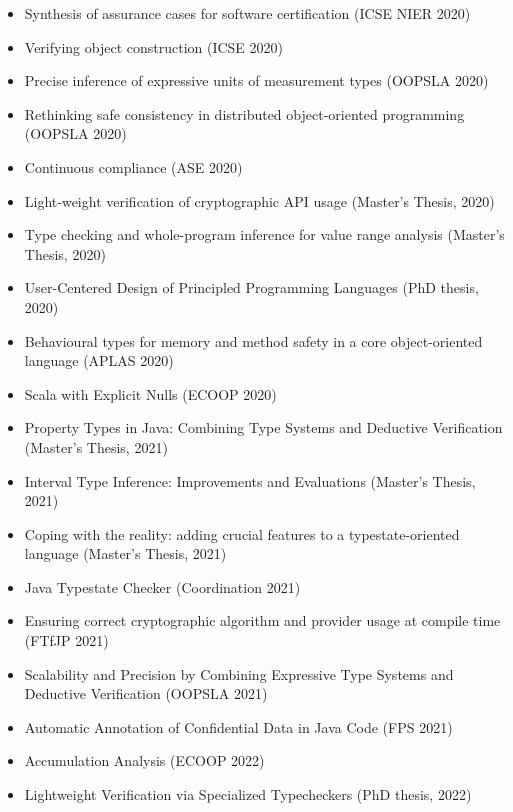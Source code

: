 \begin{itemize}
\item
  Synthesis of assurance cases for software certification (ICSE NIER 2020)~\cite{BagheriKM2020}
\item
  Verifying object construction (ICSE 2020)~\cite{KelloggRSSE2020}
\item
  Precise inference of expressive units of measurement types (OOPSLA 2020)~\cite{XiangLD2020}
\item
  Rethinking safe consistency in distributed object-oriented programming
  (OOPSLA 2020)~\cite{KohlerEWMS2020}
\item
  Continuous compliance (ASE 2020)~\cite{KelloggSTE2020}
\item
  Light-weight verification of cryptographic API usage (Master's Thesis, 2020)~\cite{Xing2020}
\item
  Type checking and whole-program inference for value range analysis (Master's Thesis, 2020)~\cite{Xiang2020}
\item
  User-Centered Design of Principled Programming Languages (PhD thesis, 2020)~\cite{Coblenz2020}
\item
  Behavioural types for memory and method safety in a core object-oriented
  language (APLAS 2020)~\cite{BravettiFGHJKR2020}
\item
  Scala with Explicit Nulls (ECOOP 2020)~\cite{NietoZLCP2020}

\item
  Property Types in {Java}: Combining Type Systems and Deductive Verification
  (Master's Thesis, 2021)~\cite{Lanzinger2021}
\item
  Interval Type Inference: Improvements and Evaluations
  (Master's Thesis, 2021)~\cite{Wang2021}
\item
  Coping with the reality: adding crucial features to a
  typestate-oriented language (Master's Thesis, 2021)~\cite{daLuzMotaM2021}
\item
  Java Typestate Checker (Coordination 2021)~\cite{MotaGR2021}
\item
  Ensuring correct cryptographic algorithm and provider usage at compile time
  (FTfJP 2021)~\cite{XingCD2021}
\item
  Scalability and Precision by Combining Expressive Type Systems and
  Deductive Verification (OOPSLA 2021)~\cite{LanzingerWUD2021}
\item
  Automatic Annotation of Confidential Data in Java Code (FPS 2021)~\cite{BastysBRS2021}

\item
  Accumulation Analysis (ECOOP 2022)~\cite{KelloggSSE2022}
\item
  Lightweight Verification via Specialized Typecheckers (PhD thesis, 2022)~\cite{Kellogg2022}


\end{itemize}



